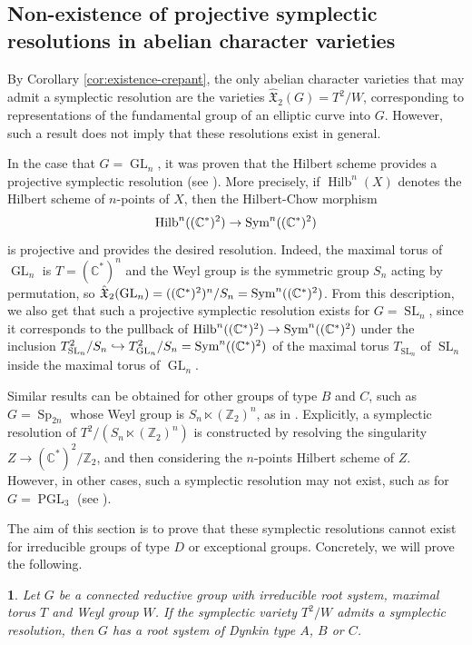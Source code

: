 \documentclass[11pt,english]{amsart}
\numberwithin{equation}{section}
\numberwithin{figure}{section}
\theoremstyle{plain}
\newtheorem{thm}{\protect\theoremname}[section]
\theoremstyle{plain}
\theoremstyle{definition}
\theoremstyle{remark}
\newcommand{\ZZ}{\mathbb{Z}}
\newcommand{\CC}{\mathbb{C}}
\newcommand{\Hilb}{\operatorname{Hilb}}
\newcommand{\GL}{\operatorname{GL}}
\newcommand{\SL}{\operatorname{SL}}
\newcommand{\PGL}{\operatorname{PGL}}
\newcommand{\Sp}{\operatorname{Sp}}
\providecommand{\theoremname}{Theorem}
\begin{document}
\subsection{Non-existence of projective symplectic resolutions in abelian character varieties}

By Corollary \ref{cor:existence-crepant}, the only abelian character varieties that may admit a symplectic resolution are the varieties $\hat{\mathfrak{X}}_{2}(G) = T^2/W$, corresponding to representations of the fundamental group of an elliptic curve into $G$. However, such a result does not imply that these resolutions exist in general.

In the case that $G = \GL_n$, it was proven that the Hilbert scheme provides a projective symplectic resolution (see \cite[Theorem 13]{BFN}). More precisely, if $\Hilb^n(X)$ denotes the Hilbert scheme of $n$-points of $X$, then the Hilbert-Chow morphism
$$
	\Hilb^n((\CC^*)^{2}) \to \textup{Sym}^n((\CC^*)^{2})
$$
is projective and provides the desired resolution. Indeed, the maximal torus of $\GL_n$ is $T = (\CC^*)^n$ and the Weyl group is the symmetric group $S_n$ acting by permutation, so $\hat{\mathfrak{X}}_2(\GL_n) = ((\CC^*)^2)^n / S_n = \textup{Sym}^n((\CC^*)^2)$. From this description, we also get that such a projective symplectic resolution exists for $G=\SL_n$, since it corresponds to the pullback of $\Hilb^n((\CC^*)^{2}) \to \textup{Sym}^n((\CC^*)^{2})$ under the inclusion $T_{\SL_n}^2/S_n \hookrightarrow T_{\GL_n}^2/S_n = \textup{Sym}^n((\CC^*)^{2})$ of the maximal torus $T_{\SL_n}$ of $\SL_n$ inside the maximal torus of $\GL_n$.

Similar results can be obtained for other groups of type $B$ and $C$, such as $G = \Sp_{2n}$ whose Weyl group is $S_n \ltimes (\ZZ_2)^n$, as in \cite{BDL}. Explicitly, a symplectic resolution of $T^2/(S_n \ltimes (\ZZ_2)^n)$ is constructed by resolving the singularity $Z \to (\CC^*)^2/\ZZ_2$, and then considering the $n$-points Hilbert scheme of $Z$. However, in other cases, such a symplectic resolution may not exist, such as for $G = \PGL_3$ (see \cite[Proposition 4.5]{Th}). 

The aim of this section is to prove that these symplectic resolutions cannot exist for irreducible groups of type $D$ or exceptional groups. Concretely, we will prove the following.

\begin{thm}
\label{thm:resolution_ABC}
Let $G$ be a connected reductive group with irreducible root system, maximal torus $T$ and Weyl group $W$. If the symplectic variety $T^2/W$ admits a symplectic resolution, then $G$ has a root system of Dynkin type $A$, $B$ or $C$.
\end{thm}
\end{document}
